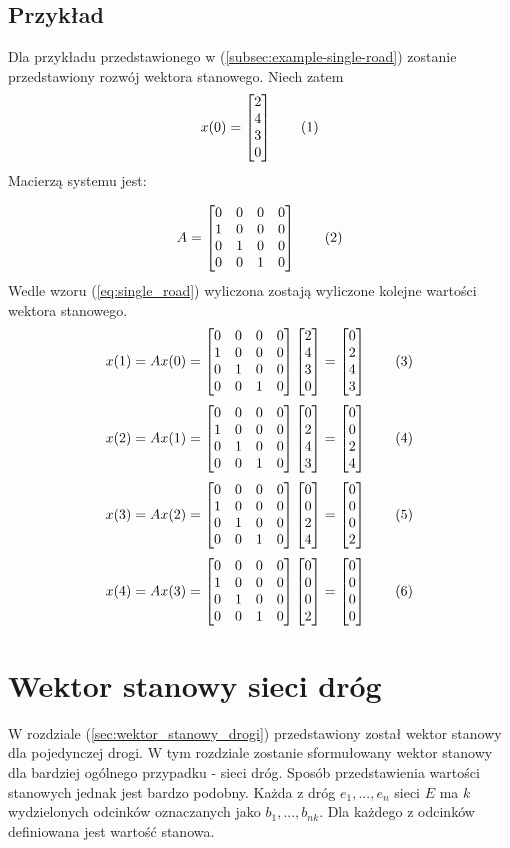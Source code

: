\documentclass[12pt]{book}
\theoremstyle{plain}
\newcommand\addtag{\refstepcounter{equation}
\renewcommand{\labelenumii}{\theenumii}
\renewcommand{\theenumii}{\theenumi.\arabic{enumii}.}
\tag{\theequation}}
\begin{document}
\subsection{Przykład}
Dla przykładu przedstawionego w (\ref{subsec:example-single-road}) zostanie przedstawiony rozwój wektora stanowego. Niech zatem
\def \xZero {\begin{bmatrix}
	2 \\ 4 \\ 3 \\ 0
	\end{bmatrix}}
\[x(0)=\xZero \addtag \]
Macierzą systemu jest:
\def \A {\begin{bmatrix}
		0 & 0 & 0 & 0 \\
		1 & 0 & 0 & 0 \\
		0 & 1 & 0 & 0 \\
		0 & 0 & 1 & 0 \\
\end{bmatrix}}

\[
A=\A \addtag
\]
Wedle wzoru (\ref{eq:single_road}) wyliczona zostają wyliczone kolejne wartości wektora stanowego.
\def \xI {\begin{bmatrix}
		0 \\ 2 \\ 4 \\ 3
\end{bmatrix}}
\[
x(1)=Ax(0)=\A \xZero = \xI \addtag
\]
\def \xII {\begin{bmatrix}
		0 \\ 0 \\ 2 \\ 4
\end{bmatrix}}
\[
x(2)=Ax(1)=\A \xI = \xII \addtag
\]
\def \xIII {\begin{bmatrix}
		0 \\ 0 \\ 0 \\ 2
\end{bmatrix}}
\[
x(3)=Ax(2)=\A \xII = \xIII \addtag
\]
\def \xIV {\begin{bmatrix}
		0 \\ 0 \\ 0 \\ 0
\end{bmatrix}}
\[
x(4)=Ax(3)=\A \xIII = \xIV \addtag
\]

\section {Wektor stanowy sieci dróg}
W rozdziale (\ref{sec:wektor_stanowy_drogi}) przedstawiony został wektor stanowy dla pojedynczej drogi. W tym rozdziale zostanie sformułowany wektor stanowy dla bardziej ogólnego przypadku - sieci dróg. Sposób przedstawienia wartości stanowych jednak jest bardzo podobny. Każda z dróg $e_1,...,e_n$ sieci $E$ ma $k$ wydzielonych odcinków oznaczanych jako $b_1,...,b_{nk}$. Dla każdego z odcinków definiowana jest wartość stanowa.
\end{document}
